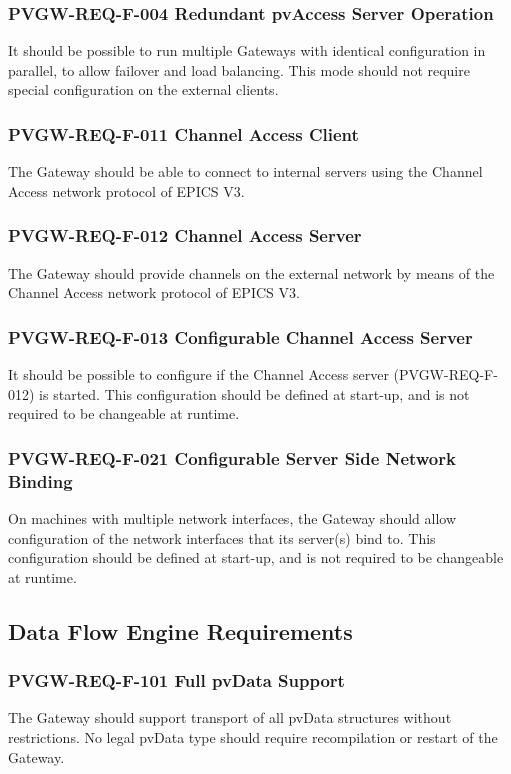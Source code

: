 \documentclass[11pt
  , a4paper
  , article
  , oneside
]{memoir}
\begin{document}
\subsubsection{PVGW-REQ-F-004 Redundant pvAccess Server Operation}
It should be possible to run multiple Gateways with identical configuration in parallel, to allow failover and load balancing. This mode should not require special configuration on the external clients.

\subsubsection{PVGW-REQ-F-011 Channel Access Client}
The Gateway should be able to connect to internal servers using the Channel Access network protocol of EPICS V3.

\subsubsection{PVGW-REQ-F-012 Channel Access Server}
The Gateway should provide channels on the external network by means of the Channel Access network protocol of EPICS V3.

\subsubsection{PVGW-REQ-F-013 Configurable Channel Access Server}
It should be possible to configure if the Channel Access server (PVGW-REQ-F-012) is started. This configuration should be defined at start-up, and is not required to be changeable at runtime.

\subsubsection{PVGW-REQ-F-021 Configurable Server Side Network Binding}
On machines with multiple network interfaces, the Gateway should allow configuration of the network interfaces that its server(s) bind to. This configuration should be defined at start-up, and is not required to be changeable at runtime.


\subsection{Data Flow Engine Requirements}

\subsubsection{PVGW-REQ-F-101 Full pvData Support}
The Gateway should support transport of all pvData structures without restrictions. No legal pvData type should require recompilation or restart of the Gateway.
\end{document}
